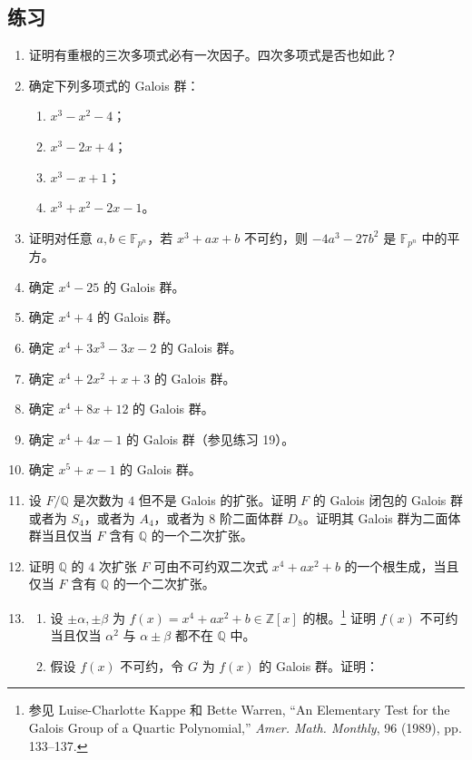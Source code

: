 \subsection*{练习}
\begin{enumerate}[label=\arabic*.]
	\item 证明有重根的三次多项式必有一次因子。四次多项式是否也如此？
	\item 确定下列多项式的 Galois 群：
	\begin{enumerate}[label=(\alph*)]
		\item $x^3-x^2-4$；
		\item $x^3-2x+4$；
		\item $x^3-x+1$；
		\item $x^3+x^2-2x-1$。
	\end{enumerate}
	\item 证明对任意 $a,b\in\mathbb F_{p^n}$，若 $x^3+ax+b$ 不可约，则 $-4a^3-27b^2$ 是 $\mathbb F_{p^n}$ 中的平方。
	\item 确定 $x^4-25$ 的 Galois 群。
	\item 确定 $x^4+4$ 的 Galois 群。
	\item 确定 $x^4+3x^3-3x-2$ 的 Galois 群。
	\item 确定 $x^4+2x^2+x+3$ 的 Galois 群。
	\item 确定 $x^4+8x+12$ 的 Galois 群。
	\item 确定 $x^4+4x-1$ 的 Galois 群（参见练习 19）。
	\item 确定 $x^5+x-1$ 的 Galois 群。
	\item 设 $F/\mathbb Q$ 是次数为 $4$ 但不是 Galois 的扩张。证明 $F$ 的 Galois 闭包的 Galois 群或者为 $S_4$，或者为 $A_4$，或者为 $8$ 阶二面体群 $D_8$。证明其 Galois 群为二面体群当且仅当 $F$ 含有 $\mathbb Q$ 的一个二次扩张。
	\item 证明 $\mathbb Q$ 的 $4$ 次扩张 $F$ 可由不可约双二次式 $x^4+ax^2+b$ 的一个根生成，当且仅当 $F$ 含有 $\mathbb Q$ 的一个二次扩张。
	\item 
	\begin{enumerate}[label=(\alph*)]
		\item 设 $\pm\alpha,\pm\beta$ 为 $f(x)=x^4+ax^2+b\in\mathbb Z[x]$ 的根。\footnote{参见 Luise-Charlotte Kappe 和 Bette Warren, “An Elementary Test for the Galois Group of a Quartic Polynomial,” \emph{Amer. Math. Monthly}, 96 (1989), pp. 133--137.} 证明 $f(x)$ 不可约当且仅当 $\alpha^2$ 与 $\alpha\pm\beta$ 都不在 $\mathbb Q$ 中。
		\item 假设 $f(x)$ 不可约，令 $G$ 为 $f(x)$ 的 Galois 群。证明：
		\begin{enumerate}[label=(\roman*)]

\end{enumerate}
\end{enumerate}
\end{enumerate}

